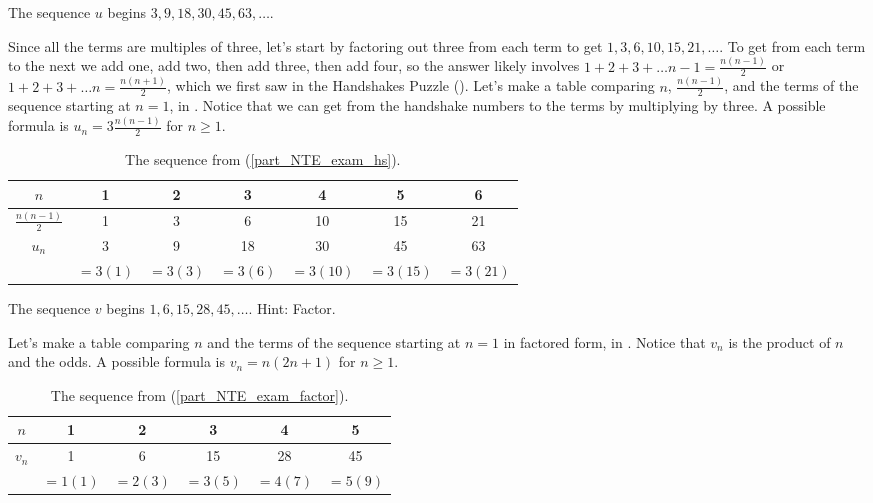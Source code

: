 \begin{exam}
\begin{apart}
            \item \label{part_NTE_exam_hs} The sequence $u$ begins $3, 9, 18, 30, 45, 63, \ldots$.            
                \begin{soln}
                    Since all the terms are multiples of three, let's start by factoring out three from each term to get $1, 3, 6, 10, 15, 21, \ldots $. To get from each term to the next we add one, add two, then add three, then add four, so the answer likely involves $1+2+3+ \ldots n-1=\frac{n(n-1)}{2}$ or $1+2+3+ \ldots n = \frac{n(n+1)}{2}$, which we first saw in the Handshakes Puzzle (). Let's make a table comparing $n$, $\frac{n(n-1)}{2}$, and the terms of the sequence starting at $n=1$, in . Notice that we can get from the handshake numbers to the terms by multiplying by three.  A possible formula is $u_n = 3\frac{n(n-1)}{2}$ for $n \ge 1$.
                \end{soln}
                \begin{table}[hbtp]
                    \centering
                    \begin{tabular}{c|c|c| c|c|c| c}
                        $n$ & 1 & 2 & 3 & 4 & 5 & 6 \\ \hline
                        $\frac{n(n-1)}{2}$ & 1 & 3 & 6 & 10 & 15 & 21\\ \hline 
                        $u_n$ & 3 & 9 & 18 & 30 & 45 & 63\\
                        & $=3(1)$ & $=3(3)$ & $=3(6)$ & $=3(10)$ & $=3(15)$ & $=3(21)$
                    \end{tabular}
                    \caption{The sequence from  (\ref{part_NTE_exam_hs}).}
                    \label{tab_NTE_exam_hs}
                \end{table}
            
            \item \label{part_NTE_exam_factor} The sequence $v$ begins $1, 6, 15, 28, 45, \ldots $. Hint: Factor. 
                \begin{soln}
                    Let's make a table comparing $n$ and the terms of the sequence starting at $n=1$ in factored form, in . Notice that $v_n$ is the product of $n$ and the odds.  A possible formula is $v_n = n(2n+1)$ for $n \ge 1$.
                \end{soln}            
                \begin{table}[hbtp]
                    \centering
                    \begin{tabular}{c|c|c|c|c|c}
                        $n$ & 1 & 2 & 3 & 4 & 5\\ \hline
                        $v_n$ & 1 & 6 & 15 & 28 & 45\\
                        & $=1(1)$ & $=2(3)$ & $=3(5)$ & $=4(7)$ & $=5(9)$
                    \end{tabular}
                    \caption{The sequence from  (\ref{part_NTE_exam_factor}).}
                    \label{tab_NTE_exam_factor}
                \end{table}


\end{apart}
\end{exam}
